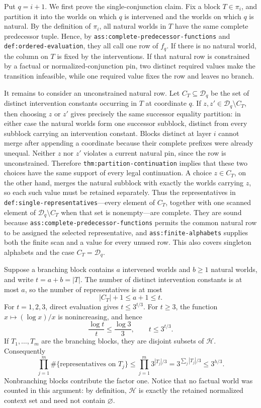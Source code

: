 Put \(q=i+1\).  We first prove the single-conjunction claim.  Fix a block \(T\in\pi_i\), and partition it into the worlds on which \(q\) is intervened and the worlds on which \(q\) is natural.  By the definition of \(\pi_i\), all natural worlds in \(T\) have the same complete predecessor tuple.  Hence, by \texttt{ass:complete-predecessor-functions} and \texttt{def:ordered-evaluation}, they all call one row of \(f_q\).  If there is no natural world, the column on \(T\) is fixed by the interventions.  If that natural row is constrained by a factual or normalized-conjunction pin, two distinct required values make the transition infeasible, while one required value fixes the row and leaves no branch.

It remains to consider an unconstrained natural row.  Let \(C_T\subseteq\mathcal D_q\) be the set of distinct intervention constants occurring in \(T\) at coordinate \(q\).  If \(z,z'\in\mathcal D_q\setminus C_T\), then choosing \(z\) or \(z'\) gives precisely the same successor equality partition: in either case the natural worlds form one successor subblock, distinct from every subblock carrying an intervention constant.  Blocks distinct at layer \(i\) cannot merge after appending a coordinate because their complete prefixes were already unequal.  Neither \(z\) nor \(z'\) violates a current natural pin, since the row is unconstrained.  Therefore \texttt{thm:partition-continuation} implies that these two choices have the same support of every legal continuation.  A choice \(z\in C_T\), on the other hand, merges the natural subblock with exactly the worlds carrying \(z\), so each such value must be retained separately.  Thus the representatives in \texttt{def:single-representatives}---every element of \(C_T\), together with one scanned element of \(\mathcal D_q\setminus C_T\) when that set is nonempty---are complete.  They are sound because \texttt{ass:complete-predecessor-functions} permits the common natural row to be assigned the selected representative, and \texttt{ass:finite-alphabets} supplies both the finite scan and a value for every unused row.  This also covers singleton alphabets and the case \(C_T=\mathcal D_q\).

Suppose a branching block contains \(a\) intervened worlds and \(b\geq1\) natural worlds, and write \(t=a+b=|T|\).  The number of distinct intervention constants is at most \(a\), so the number of representatives is at most
\[
 |C_T|+1\leq a+1\leq t.
\]
For \(t=1,2,3\), direct evaluation gives \(t\leq3^{t/3}\).  For \(t\geq3\), the function \(x\mapsto(\log x)/x\) is nonincreasing, and hence
\[
 \frac{\log t}{t}\leq\frac{\log3}{3},
 \qquad t\leq3^{t/3}.
\]
If \(T_1,\ldots,T_m\) are the branching blocks, they are disjoint subsets of \(\mathcal H\).  Consequently
\[
 \prod_{j=1}^m \#\{\text{representatives on }T_j\}
 \leq \prod_{j=1}^m3^{|T_j|/3}
 =3^{\sum_j|T_j|/3}
 \leq3^{h/3}.
\tag{1}
\]
Nonbranching blocks contribute the factor one.  Notice that no factual world was counted in this argument: by definition, \(\mathcal H\) is exactly the retained normalized context set and need not contain \(\varnothing\).

